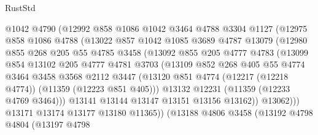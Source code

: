 \begin{lexlean}{RustStd}
\begin{coremodule}
{{{{{{{{{{{{{{{{{{{                  @1042
                  @4790
                  (@12992
                    @858
                    @1086
                    @1042
                    @3464
                    @4788
                    @3304
                    @1127
                    (@12975
                      @858
                      @1086
                      @4788
                      (@13022
                        @857
                        @1042
                        @1085
                        @3689
                        @4787
                        @13079
                        (@12980
                          @855
                          @268
                          @205
                          @55
                          @4785
                          @3458
                          (@13092
                            @855
                            @205
                            @4777
                            @4783
                            (@13099
                              @854
                              @13102
                              @205
                              @4777
                              @4781
                              @3703
                              (@13109
                                @852
                                @268
                                @405
                                @55
                                @4774
                                @3464
                                @3458
                                @3568
                                @2112
                                @3447
                                (@13120
                                  @851
                                  @4774
                                  (@12217 (@12218 @4774))
                                  (@11359 (@12223 @851 @405)))
                                @13132
                                @12231
                                (@11359 (@12233 @4769 @3464)))
                              @13141
                              @13144
                              @13147
                              @13151
                              @13156
                              @13162))
                          @13062)))
                    @13171
                    @13174
                    @13177
                    @13180
                    @11365))
                (@13188
                  @4806
                  @3458
                  (@13192
                    @4798
                    @4804
                    (@13197
                      @4798
}}}}}}}}}}}}}}}}}}}
\end{coremodule}
\end{lexlean}
